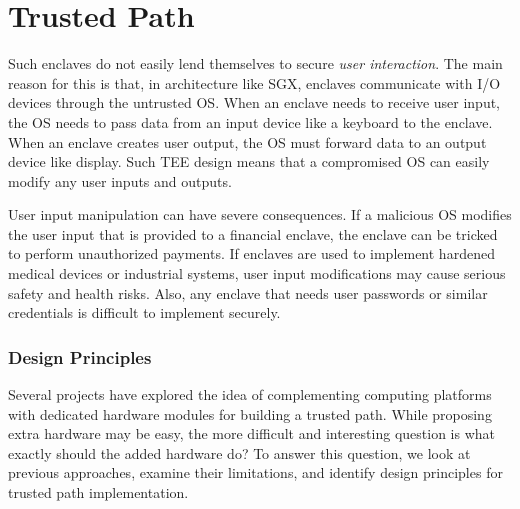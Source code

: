 
\section*{Trusted Path}

 Such enclaves do not easily lend themselves to secure \emph{user interaction}. The main reason for this is that, in architecture like SGX, enclaves communicate with I/O devices through the untrusted OS. When an enclave needs to receive user input, the OS needs to pass data from an input device like a keyboard to the enclave. When an enclave creates user output, the OS must forward data to an output device like display. Such TEE design means that a compromised OS can easily modify any user inputs and outputs.

User input manipulation can have severe consequences. If a malicious OS modifies the user input that is provided to a financial enclave, the enclave can be tricked to perform unauthorized payments. If enclaves are used to implement hardened medical devices or industrial systems, user input modifications may cause serious safety and health risks. Also, any enclave that needs user passwords or similar credentials is difficult to implement securely.




\subsubsection*{Design Principles}

Several projects have explored the idea of complementing computing platforms with dedicated hardware modules for building a trusted path. While proposing extra hardware may be easy, the more difficult and interesting question is what exactly should the added hardware do? To answer this question, we look at previous approaches, examine their limitations, and identify design principles for trusted path implementation.
    
